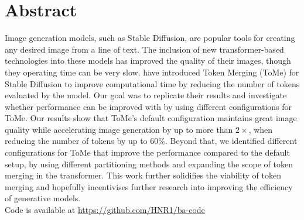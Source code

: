 \section*{Abstract}
Image generation models, such as Stable Diffusion, are popular tools for creating any desired image from a line of text. 
The inclusion of new transformer-based technologies into these models has improved the quality of their images, though they operating time can be very slow.
\cite{bolya2023tomesd} have introduced Token Merging (ToMe) for Stable Diffusion to improve computational time by reducing the number of tokens evaluated by the model.
Our goal was to replicate their results and investigate whether performance can be improved with by using different configurations for ToMe.
Our results show that ToMe's default configuration maintains great image quality while accelerating image generation by up to more than $2 \times$, when reducing the number of tokens by up to \(60\%\). Beyond that, we identified different configurations for ToMe that improve the performance compared to the default setup, by using different partitioning methods and expanding the scope of token merging in the transformer. 
This work further solidifies the viability of token merging and hopefully incentivises further research into improving the efficiency of generative models.\\
Code is available at \url{https://github.com/HNR1/ba-code}
